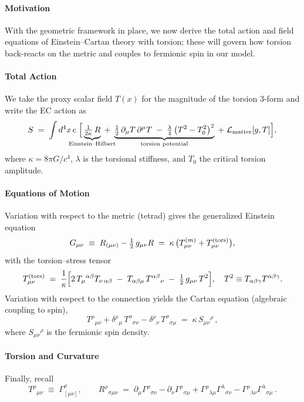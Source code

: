 \documentclass{article}
\begin{document}
\paragraph{Motivation}
With the geometric framework in place, we now derive the total action and field equations of Einstein–Cartan theory with torsion; these will govern how torsion back-reacts on the metric and couples to fermionic spin in our model.

\paragraph{Total Action}
We take the proxy scalar field \(T(x)\) for the magnitude of the torsion 3-form and write the EC action as
\[
  S \;=\;\int d^4x\,e\;\Big[
    \underbrace{\tfrac1{2\kappa}\,R}_{\mathclap{\text{Einstein–Hilbert}}}
  \;+\;
    \underbrace{\tfrac12\,\partial_\mu T\,\partial^\mu T
    \;-\;\tfrac{\lambda}{4}\,\bigl(T^2 - T_0^2\bigr)^2}_{\mathclap{\text{torsion potential}}}
  \;+\;\mathcal L_{\rm matter}[g,T]
  \Big] ,
\]
where 
\(\kappa=8\pi G/c^4\), \(\lambda\) is the torsional stiffness, and \(T_0\) the critical torsion amplitude.

\paragraph{Equations of Motion}
Variation with respect to the metric (tetrad) gives the generalized Einstein equation
\[
  G_{\mu\nu}\;\equiv\;R_{(\mu\nu)} - \tfrac12\,g_{\mu\nu}R
  \;=\;\kappa\,\bigl(T^{(m)}_{\mu\nu} + T^{(\rm tors)}_{\mu\nu}\bigr),
\]
with the torsion–stress tensor
\[
  T^{(\rm tors)}_{\mu\nu}
  \;=\;\frac1\kappa\Bigl[
    2\,T_{\mu}{}^{\alpha\beta}T_{\nu\,\alpha\beta}
    \;-\;T_{\alpha\beta\mu}\,T^{\alpha\beta}{}_{\nu}
    \;-\;\tfrac12\,g_{\mu\nu}\,T^2
  \Bigr] ,
  \quad
  T^2\equiv T_{\alpha\beta\gamma}T^{\alpha\beta\gamma}.
\]
Variation with respect to the connection yields the Cartan equation (algebraic coupling to spin),
\[
  T^\rho{}_{\mu\nu}
  +\delta^\rho{}_\mu\,T^\sigma{}_{\sigma\nu}
  -\delta^\rho{}_\nu\,T^\sigma{}_{\sigma\mu}
  \;=\;
  \kappa\,S_{\mu\nu}{}^{\rho}\,,
\]
where \(S_{\mu\nu}{}^\rho\) is the fermionic spin density.

\paragraph{Torsion and Curvature}
Finally, recall
\[
  T^\rho{}_{\mu\nu} \;\equiv\;\Gamma^\rho_{[\mu\nu]},
  \qquad
  R^\rho{}_{\sigma\mu\nu}
  \;=\;\partial_\mu\Gamma^\rho{}_{\sigma\nu}
      -\partial_\nu\Gamma^\rho{}_{\sigma\mu}
      +\Gamma^\rho{}_{\lambda\mu}\Gamma^\lambda{}_{\sigma\nu}
      -\Gamma^\rho{}_{\lambda\nu}\Gamma^\lambda{}_{\sigma\mu}\,. 
\]
\end{document}
